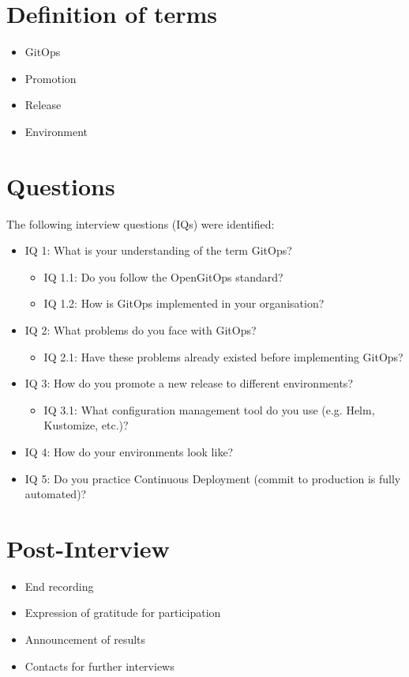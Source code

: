 \section{Definition of terms}

\begin{itemize}
	\item GitOps
	\item Promotion
	\item Release
	\item Environment
\end{itemize}

\section{Questions}

The following interview questions (IQs) were identified:

\begin{itemize}
	\item IQ 1: What is your understanding of the term GitOps?
	\begin{itemize}
		\item IQ 1.1: Do you follow the OpenGitOps standard?
		\item IQ 1.2: How is GitOps implemented in your organisation?
	\end{itemize}

	\item IQ 2: What problems do you face with GitOps?
	\begin{itemize}
		\item IQ 2.1: Have these problems already existed before implementing GitOps?
	\end{itemize}

	\item IQ 3: How do you promote a new release to different environments?
	\begin{itemize}
		\item IQ 3.1: What configuration management tool do you use (e.g. Helm, Kustomize, etc.)?
	\end{itemize}

	\item IQ 4: How do your environments look like?
	
	\item IQ 5: Do you practice Continuous Deployment (commit to production is fully automated)?

\end{itemize}

\section{Post-Interview}

\begin{itemize}
	\item End recording
	\item Expression of gratitude for participation
	\item Announcement of results
	\item Contacts for further interviews
\end{itemize}
